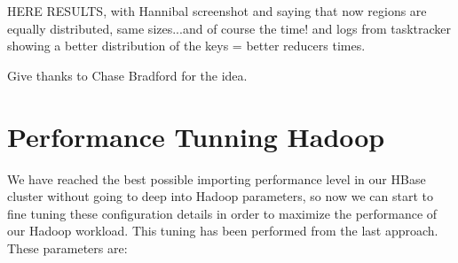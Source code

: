 HERE RESULTS, with Hannibal screenshot and saying that now regions are equally distributed, same sizes...and of course the time! and logs from tasktracker showing a better distribution of the keys = better reducers times. 



Give thanks to Chase Bradford for the idea.


\section{Performance Tunning Hadoop}

We have reached the best possible importing performance level in our HBase cluster without going to deep into Hadoop parameters, so now we can start to fine tuning these configuration details in order to maximize the performance of our Hadoop workload. This tuning has been performed from the last approach. These parameters are:

